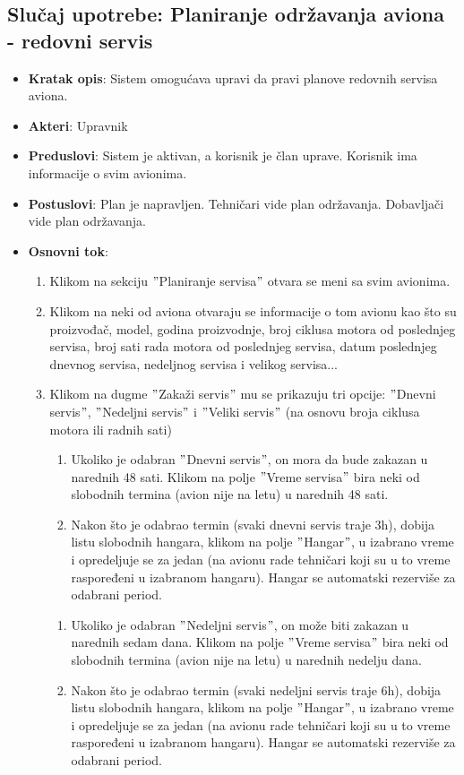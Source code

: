 \documentclass[a4paper]{article}
\begin{document}
\subsection{Slučaj upotrebe: Planiranje održavanja aviona - redovni servis}
\label{subsec:redovan_servis}
\begin{itemize}
    \item \textbf{Kratak opis}: Sistem omogućava upravi da pravi planove redovnih servisa aviona.
    \item \textbf{Akteri}: Upravnik
    \item \textbf{Preduslovi}: Sistem je aktivan, a korisnik je član uprave. Korisnik ima informacije o svim avionima.
    \item \textbf{Postuslovi}: Plan je napravljen. Tehničari vide plan održavanja. Dobavljači vide plan održavanja.
    \item \textbf{Osnovni tok}: 
    \begin{enumerate}
        \item Klikom na sekciju $"$Planiranje servisa$"$ otvara se meni sa svim avionima.

        \item Klikom na neki od aviona otvaraju se informacije o tom avionu kao što su proizvođač, model, godina proizvodnje, broj ciklusa motora od poslednjeg servisa, broj sati rada motora od poslednjeg servisa, datum poslednjeg dnevnog servisa, nedeljnog servisa i velikog servisa...

        \item Klikom na dugme $"$Zakaži servis$"$ mu se prikazuju tri opcije: $"$Dnevni servis$"$, $"$Nedeljni servis$"$ i $"$Veliki servis$"$ (na osnovu broja ciklusa motora ili radnih sati)
        \begin{enumerate}[label=3.1.\arabic*]
            \item Ukoliko je odabran $"$Dnevni servis$"$, on mora da bude zakazan u narednih 48 sati. Klikom na polje $"$Vreme servisa$"$ bira neki od slobodnih termina (avion nije na letu) u narednih 48 sati.
            \item Nakon što je odabrao termin (svaki dnevni servis traje 3h), dobija listu slobodnih hangara, klikom na polje $"$Hangar$"$, u izabrano vreme i opredeljuje se za jedan (na avionu rade tehničari koji su u to vreme raspoređeni u izabranom hangaru). Hangar se automatski rezerviše za odabrani period.
        \end{enumerate}
        \begin{enumerate}[label=3.2.\arabic*]
            \item Ukoliko je odabran $"$Nedeljni servis$"$, on može biti zakazan u narednih sedam dana. Klikom na polje $"$Vreme servisa$"$ bira neki od slobodnih termina (avion nije na letu) u narednih nedelju dana.
            \item Nakon što je odabrao termin (svaki nedeljni servis traje 6h), dobija listu slobodnih hangara, klikom na polje $"$Hangar$"$, u izabrano vreme i opredeljuje se za jedan (na avionu rade tehničari koji su u to vreme raspoređeni u izabranom hangaru). Hangar se automatski rezerviše za odabrani period.
        \end{enumerate}


\end{enumerate}
\end{itemize}
\end{document}
